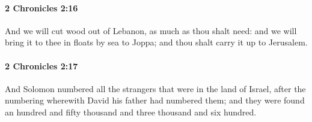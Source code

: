 		\paragraph{2 Chronicles 2:16} %
			\label{2CHRONICLES-2-16}

			And we will cut wood out of Lebanon, as much as thou shalt need: and we will bring it to thee in floats by sea to Joppa; and thou shalt carry it up to Jerusalem.


		\paragraph{2 Chronicles 2:17} %
			\label{2CHRONICLES-2-17}

			And Solomon numbered all the strangers that were in the land of Israel, after the numbering wherewith David his father had numbered them; and they were found an hundred and fifty thousand and three thousand and six hundred.

